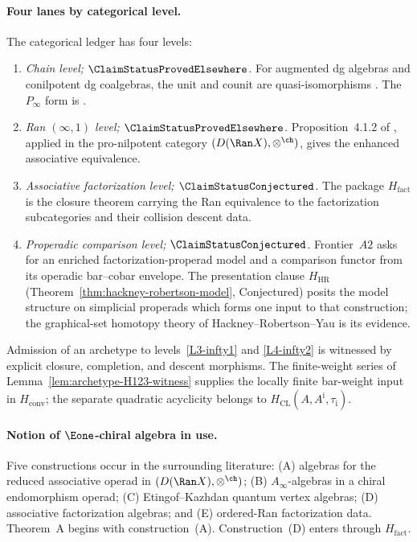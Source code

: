 \paragraph{Four lanes by categorical level.}
\label{par:A-four-lanes}%
%
The categorical ledger has four levels:
\begin{enumerate}[label=\textsc{L\arabic*.}]
\item \label{L1-chain} \emph{Chain level;
$\ClaimStatusProvedElsewhere$.}
For augmented dg algebras and conilpotent dg coalgebras, the unit and
counit are quasi-isomorphisms
\cite[Corollary~2.3.4]{LV12}.  The $P_\infty$ form is
\cite[Proposition~11.4.4]{LV12}.
\item \label{L2-quillen} \emph{Ran $(\infty,1)$ level;
$\ClaimStatusProvedElsewhere$.}
Proposition~4.1.2 of \cite{Francis2012}, applied in the
pro-nilpotent category $(D(\Ran X),\otimes^{\ch})$, gives the enhanced
associative equivalence.
\item \label{L3-infty1} \emph{Associative factorization level;
$\ClaimStatusConjectured$.}
The package $H_{\mathrm{fact}}$ is the closure theorem carrying the
Ran equivalence to the factorization subcategories and their collision
descent data.
\item \label{L4-infty2} \emph{Properadic comparison level;
$\ClaimStatusConjectured$.}
Frontier~$A2$ asks for an enriched factorization-properad model and a
comparison functor from its operadic bar--cobar envelope.  The
presentation clause $H_{\mathrm{HR}}$
(Theorem~\ref{thm:hackney-robertson-model}, Conjectured) posits the
model structure on simplicial properads which forms one input to that
construction; the graphical-set homotopy theory of
Hackney--Robertson--Yau \cite{HRY17} is its evidence.
\end{enumerate}
Admission of an archetype to levels~\ref{L3-infty1} and
\ref{L4-infty2} is witnessed by explicit closure, completion, and
descent morphisms.  The finite-weight series of
Lemma~\ref{lem:archetype-H123-witness} supplies the locally finite
bar-weight input in $H_{\mathrm{conv}}$; the separate quadratic
acyclicity belongs to $H_{\mathrm{CL}}(A,A^{\mathrm i},\tau_{\mathrm i})$.

\paragraph{Notion of $\Eone$-chiral algebra in use.}
Five constructions occur in the surrounding literature:
(A) algebras for the reduced associative operad in
$(D(\Ran X),\otimes^{\ch})$; (B) $A_\infty$-algebras in a chiral
endomorphism operad; (C) Etingof--Kazhdan quantum vertex algebras;
(D) associative factorization algebras; and (E) ordered-Ran
factorization data.  Theorem~A begins with construction~(A).
Construction~(D) enters through $H_{\mathrm{fact}}$.

